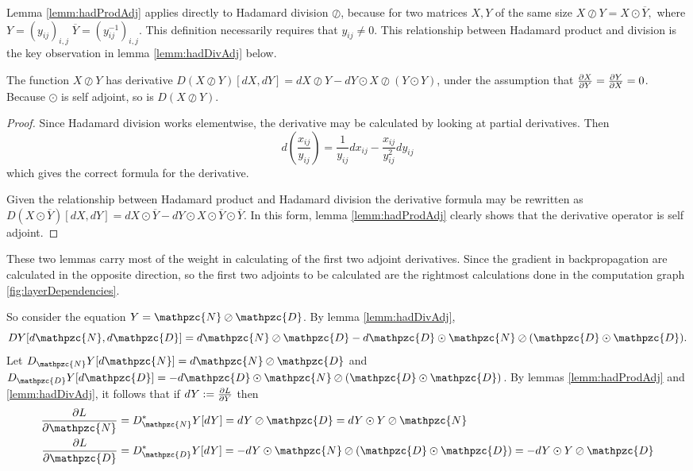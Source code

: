 Lemma \ref{lemm:hadProdAdj} applies directly to Hadamard division \( \oslash \), because for two matrices \( X,Y \) of the same size \( X\oslash Y = X\odot \overbar{Y},\) where \(Y = (y_{ij})_{i,j}\; \overbar{Y} = (y_{ij}^{-1})_{i,j} \). This definition necessarily requires that \( y_{ij}\neq 0 \). This relationship between Hadamard product and division is the key observation in lemma \ref{lemm:hadDivAdj} below.

\begin{lemm}\label{lemm:hadDivAdj}
	The function \( X\oslash Y \) has derivative \( D(X\oslash Y)[dX,dY] = dX\oslash Y-dY\odot X\oslash(Y\odot Y) \), under the assumption that \( \pdv{X}{Y}=\pdv{Y}{X}=0 \). Because \( \odot \) is self adjoint, so is \( D(X\oslash Y) \).
\end{lemm}

\begin{proof}
	Since Hadamard division works elementwise, the derivative may be calculated by looking at partial derivatives. Then 
	\[ d\left(\frac{x_{ij}}{y_{ij}}\right) = \frac{1}{y_{ij}}dx_{ij}-\frac{x_{ij}}{y_{ij}^{2}}dy_{ij} \]
	which gives the correct formula for the derivative.
	
	Given the relationship between Hadamard product and Hadamard division the derivative formula may be rewritten as \( D(X\odot \overbar{Y})[dX,dY] = dX\odot\overbar{Y}-dY\odot X\odot\overbar{Y}\odot\overbar{Y}. \)  In this form, lemma \ref{lemm:hadProdAdj} clearly shows that the derivative operator is self adjoint.
\end{proof}

These two lemmas carry most of the weight in calculating of the first two adjoint derivatives. Since the gradient in backpropagation are calculated in the opposite direction, so the first two adjoints to be calculated are the rightmost calculations done in the computation graph \ref{fig:layerDependencies}.

\begin{calc}[Adjoint \#1]\label{calc:adj1}
	So consider the equation \( Y = \mathpzc{N}\oslash\mathpzc{D} \). By lemma \ref{lemm:hadDivAdj}, 
\begin{equation}\label{eqn:DYcalc1}
DY[d\mathpzc{N},d\mathpzc{D}] = d\mathpzc{N}\oslash \mathpzc{D}-d\mathpzc{D}\odot \mathpzc{N}\oslash(\mathpzc{D}\odot \mathpzc{D}).
\end{equation} 
Let \( D_{\mathpzc{N}}Y[d\mathpzc{N}] = d\mathpzc{N}\oslash \mathpzc{D} \) and \( D_{\mathpzc{D}}Y[d\mathpzc{D}] =  -d\mathpzc{D}\odot \mathpzc{N}\oslash(\mathpzc{D}\odot \mathpzc{D})\). By lemmas \ref{lemm:hadProdAdj} and \ref{lemm:hadDivAdj}, it follows that if \( dY:=\pdv{L}{Y} \) then 
\begin{align}
\pdv{L}{\mathpzc{N}} &= D_{\mathpzc{N}}^{\ast}Y[dY]=dY\oslash \mathpzc{D} = dY\odot Y\oslash\mathpzc{N}\label{eqn:gradcalc1} \\
\pdv{L}{\mathpzc{D}} &= D_{\mathpzc{D}}^{\ast}Y[dY]=-dY\odot\mathpzc{N}\oslash(\mathpzc{D}\odot\mathpzc{D}) = -dY\odot Y\oslash\mathpzc{D} \label{eqn:gradcalc2}
\end{align}
\end{calc}

